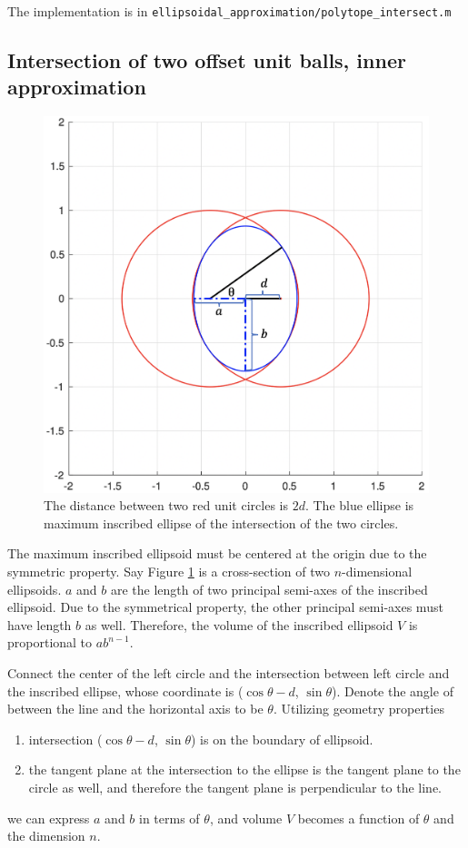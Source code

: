 \documentclass{article}
\begin{document}
The implementation is in \texttt{ellipsoidal\_approximation/polytope\_intersect.m}

\subsection{Intersection of two offset unit balls, inner approximation}
\label{section_intersect_offset_unitball_ia}
\begin{figure}[h!]
	\centering
	\includegraphics[width=0.6\linewidth]{intersect_offset_unitball_ia/1.png}
	\caption{The distance between two red unit circles is $2d$. The blue ellipse is maximum inscribed ellipse of the intersection of the two circles.}
	\label{intersect_offset_unitball_ia}
\end{figure}

The maximum inscribed ellipsoid must be centered at the origin due to the symmetric property. Say Figure \ref{intersect_offset_unitball_ia} is a cross-section of two $n$-dimensional ellipsoids. $a$ and $b$ are the length of two principal semi-axes of the inscribed ellipsoid. Due to the symmetrical property, the other principal semi-axes must have length $b$ as well. Therefore, the volume of the inscribed ellipsoid $V$ is proportional to $ab^{n-1}$.

Connect the center of the left circle and the intersection between left circle and the inscribed ellipse, whose coordinate is ($\cos\theta - d $, $\sin\theta$). Denote the angle of between the line and the horizontal axis to be $\theta$. Utilizing geometry properties 

\begin{enumerate}
\item intersection ($\cos\theta - d $, $\sin\theta$) is on the boundary of ellipsoid.
\item the tangent plane at the intersection to the ellipse is the tangent plane to the circle as well, and therefore the tangent plane is perpendicular to the line.
\end{enumerate}
we can express $a$ and $b$ in terms of $\theta$, and volume $V$ becomes a function of $\theta$ and the dimension $n$.
\end{document}
